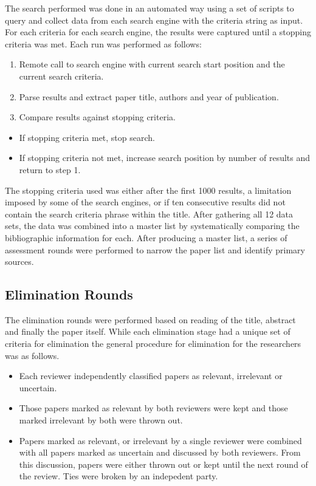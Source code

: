 The search performed was done in an automated way using a set of scripts to query and collect data from each search engine with the criteria string as input.  For each criteria for each search engine, the results were captured until a stopping criteria was met.  Each run was performed as follows:

\begin{enumerate}
\item Remote call to search engine with current search start position and the current search criteria.
\item Parse results and extract paper title, authors and year of publication.
\item Compare results against stopping criteria.
\end{enumerate}

\begin{itemize}
\item If stopping criteria met, stop search.
\item If stopping criteria not met, increase search position by number of results and return to step 1.
\end{itemize}

The stopping criteria used was either after the first 1000 results, a limitation imposed by some of the search engines, or if ten consecutive results did not contain the search criteria phrase within the title.  After gathering all 12 data sets, the data was combined into a master list by systematically comparing the bibliographic information for each.  After producing a master list, a series of assessment rounds were performed to narrow the paper list and identify primary sources.

\subsection{Elimination Rounds}

The elimination rounds were performed based on reading of the title, abstract and finally the paper itself.  While each elimination stage had a unique set of criteria for elimination the general procedure for elimination for the researchers was as follows.

\begin{itemize}
\item Each reviewer independently classified papers as relevant, irrelevant or uncertain.
\item Those papers marked as relevant by both reviewers were kept and those marked irrelevant by both were thrown out.
\item Papers marked as relevant, or irrelevant by a single reviewer were combined with all papers marked as uncertain and discussed by both reviewers.  From this discussion, papers were either thrown out or kept until the next round of the review.  Ties were broken by an indepedent party.
\end{itemize}

